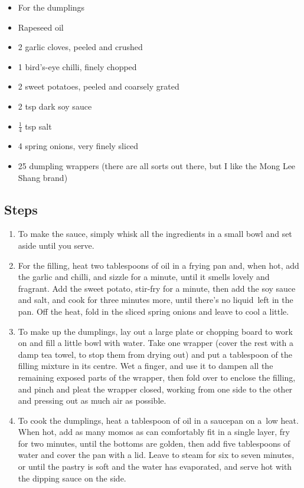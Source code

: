 \documentclass{book}
\begin{document}
\begin{itemize}
\item For the dumplings
\item Rapeseed oil
\item 2 garlic cloves, peeled and crushed 
\item 1 bird’s-eye chilli, finely chopped
\item 2 sweet potatoes, peeled and coarsely grated 
\item 2 tsp dark soy sauce
\item $\frac{1}{4}$ tsp salt
\item 4 spring onions, very finely sliced 
\item 25 dumpling wrappers (there are all sorts out there, but I like the Mong Lee Shang brand) 
\end{itemize}

\subsection*{Steps}
\begin{enumerate}
\item To make the sauce, simply whisk all the ingredients in a small bowl and set aside until you serve.
\item For the filling, heat two tablespoons of oil in a frying pan and, when hot, add the garlic and chilli, and sizzle for a minute, until it smells lovely and fragrant. Add the sweet potato, stir-fry for a minute, then add the soy sauce and salt, and cook for three minutes more, until there’s no liquid left in the pan. Off the heat, fold in the sliced spring onions and leave to cool a little.
\item To make up the dumplings, lay out a large plate or chopping board to work on and fill a little bowl with water. Take one wrapper (cover the rest with a damp tea towel, to stop them from drying out) and put a tablespoon of the filling mixture in its centre. Wet a finger, and use it to dampen all the remaining exposed parts of the wrapper, then fold over to enclose the filling, and pinch and pleat the wrapper closed, working from one side to the other and pressing out as much air as possible.
\item To cook the dumplings, heat a tablespoon of oil in a saucepan on a low heat. When hot, add as many momos as can comfortably fit in a single layer, fry for two minutes, until the bottoms are golden, then add five tablespoons of water and cover the pan with a lid. Leave to steam for six to seven minutes, or until the pastry is soft and the water has evaporated, and serve hot with the dipping sauce on the side.
\end{enumerate}
\newpage
\end{document}
